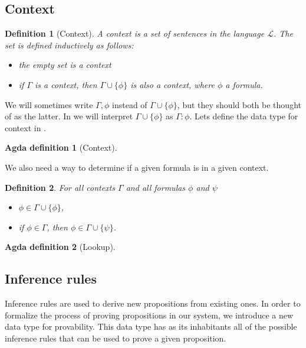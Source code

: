 \documentclass[titlepage]{article}
\newtheorem{definition}{Definition}[section]
\newtheorem{agdadef}{Agda definition}
\begin{document}

\subsection{Context}
\begin{definition}[Context]
    A context is a set of sentences in the language $\mathcal{L}$. The set is defined inductively as follows:
    \begin{itemize}
        \item the empty set is a context
        \item if $\Gamma$ is a context, then $\Gamma \cup \{\phi\}$ is also a context, where $\phi$ a formula.
    \end{itemize}
\end{definition}
We will sometimes write $\Gamma, \phi$ instead of $\Gamma \cup \{\phi\}$, but they should both be thought of as the latter. In \Agda we will interpret $\Gamma \cup \{\phi\}$ as $\Gamma : \phi$. Lets define the data type for context in \Agda.

\begin{agdadef}[Context]$ $
\end{agdadef}
We also need a way to determine if a given formula is in a given context. 
\begin{definition}\label{lookup}
    For all contexts $\Gamma$ and all formulas $\phi$ and $\psi$
    \begin{itemize}
        \item $\phi \in \Gamma \cup \{\phi\}$,
        \item if $\phi \in \Gamma$, then $\phi \in \Gamma \cup \{\psi\}$.
    \end{itemize}
\end{definition}

\begin{agdadef}[Lookup]$ $
\end{agdadef}



\subsection{Inference rules}

Inference rules are used to derive new propositions from existing ones. In order to formalize the process of proving propositions in our system, we introduce a new data type for provability. This data type has as its inhabitants all of the possible inference rules that can be used to prove a given proposition.
\end{document}
